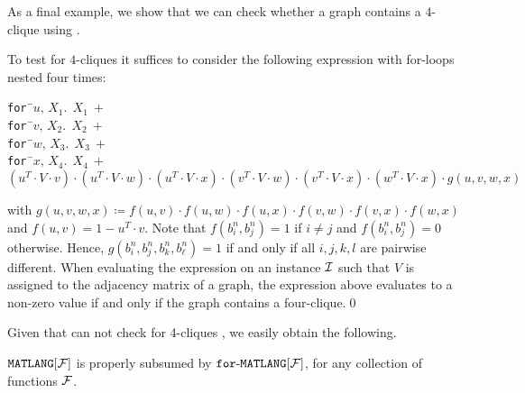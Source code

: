 As a final example, we show that we can check whether a graph contains a $4$-clique using \langfor.
\begin{example}\label{ex:fourcliques}
To test for $4$-cliques it suffices to consider the following expression with for-loops nested four times:
\begin{center}
\parbox{0cm}{
\begin{tabbing}
\texttt{for\,}\=$u,\,X_1.\ \ X_1 \ + $\\
\> \texttt{for\,}\=$v,\,X_2.\ \ X_2 \ +$ \\
\>\>\texttt{for\,}\=$w,\,X_3.\ \ X_3 \ +$ \\
\>\>\>\texttt{for\,}\=$x,\,X_4.\ \ X_4 \ +$ \\
\>\>\>\>$(u^T\!\cdot\! V\!\cdot\! v) \!\cdot\! (u^T\!\cdot\! V\!\cdot\! w)\!\cdot\! (u^T\!\cdot\! V\!\cdot\! x) \!\cdot\! (v^T\!\cdot\! V\!\cdot\! w) \!\cdot\! (v^T\!\cdot\! V\!\cdot\! x)\!\cdot\! (w^T\!\cdot\! V\!\cdot\! x) \!\cdot\! g(u,v,w,x)$
\end{tabbing}
}
\end{center}
with $g(u,v,w,x)\coloneqq f(u,v)\cdot f(u,w)\cdot f(u,x)\cdot f(v,w)\cdot f(v,x)\cdot f(w,x)$ and
$f(u,v)=1-u^T\cdot v$. Note that $f(b_i^n,b_j^n)=1$ if $i\neq j$ and $f(b_i^n,b_j^n)=0$ otherwise.
Hence, $g(b_i^n,b_j^n,b_k^n,b_\ell^n)=1$ if and only if all $i,j,k,l$ are pairwise different.
When evaluating the expression on an instance $\mathcal{I}$ such that $V$ is assigned to the adjacency 
matrix of a graph, the expression above evaluates to a non-zero value if and only if the graph
contains a four-clique.\qed
\end{example}

Given that \lang can not check for 4-cliques \cite{matlang-journal}, we easily obtain the following.

\begin{proposition}
\label{cor-ml-fml}
$\texttt{MATLANG}[\mathcal{F}]$ is properly subsumed by $\texttt{for}\text{-}\texttt{MATLANG}[\mathcal{F}]$, for any collection of functions $\mathcal{F}$.
\end{proposition} 

